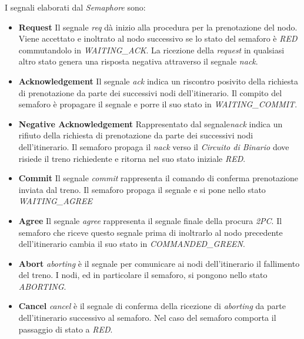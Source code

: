 I segnali elaborati dal \textit{Semaphore} sono:
\begin{itemize}
  \item \textbf{Request} Il segnale \textit{req} dà inizio alla procedura per la prenotazione del nodo. Viene accettato
  e inoltrato al nodo successivo se lo stato del semaforo è \textit{RED}
  commutandolo in \textit{WAITING\_ACK}. La ricezione della
  \textit{request} in qualsiasi altro stato genera una risposta negativa attraverso il segnale
  \textit{nack}.
  \item \textbf{Acknowledgement} Il segnale \textit{ack} indica un riscontro posivito della richiesta di prenotazione da
  parte dei successivi nodi dell'itinerario. Il compito del semaforo è
  propagare il segnale e porre il suo stato in \textit{WAITING\_COMMIT}.
  \item \textbf{Negative Acknowledgement} Rappresentato dal
  segnale\textit{nack} indica un rifiuto della richiesta di prenotazione da parte dei successivi nodi
  dell'itinerario. Il semaforo propaga il \textit{nack} verso il \textit{Circuito di Binario} dove
  risiede il treno richiedente e ritorna nel suo stato iniziale \textit{RED}.
  \item \textbf{Commit} Il segnale \textit{commit} rappresenta il comando di conferma prenotazione inviata dal treno. Il
  semaforo propaga il segnale e si pone nello stato \textit{WAITING\_AGREE}
  \item \textbf{Agree} Il segnale \textit{agree} rappresenta il segnale finale della procura \emph{2PC}. Il semaforo che
  riceve questo segnale prima di inoltrarlo al nodo precedente dell'itinerario
  cambia il suo stato in \textit{COMMANDED\_GREEN}.
  \item \textbf{Abort} \textit{aborting} è il segnale per comunicare ai nodi dell'itinerario il
  fallimento del treno. I nodi, ed in particolare il semaforo, si pongono nello stato
  \textit{ABORTING}.
  \item \textbf{Cancel} \textit{cancel} è il segnale di conferma della ricezione di \textit{aborting} da parte dell'itinerario successivo al semaforo.
  Nel caso del semaforo comporta il passaggio di stato a \textit{RED}.
\end{itemize}

